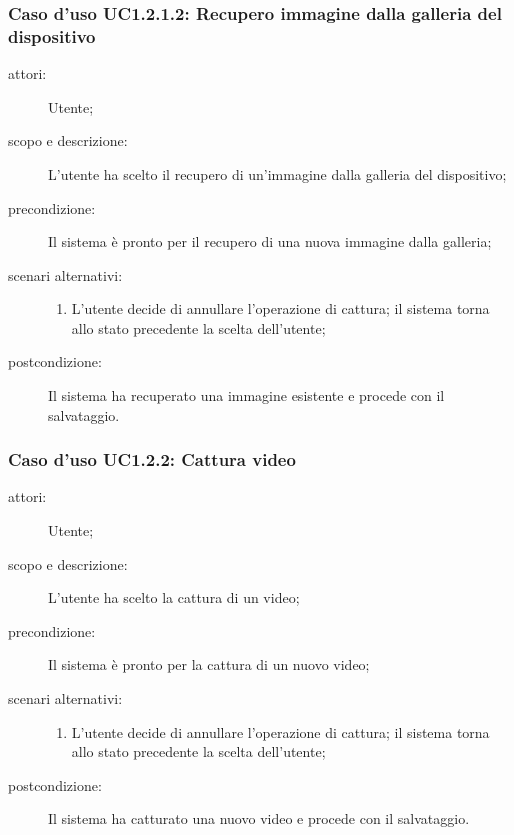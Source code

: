 \subsubsection{Caso d'uso UC1.2.1.2: Recupero immagine dalla galleria del dispositivo}
\begin{description}
\item[attori:] Utente;
\item[scopo e descrizione:] L'utente ha scelto il recupero di un'immagine dalla galleria del dispositivo;
\item[precondizione:] Il sistema è pronto per il recupero di una nuova immagine dalla galleria;
\item[scenari alternativi:] \hfill 
	\begin{enumerate}
	\item L'utente decide di annullare l'operazione di cattura; il sistema torna allo stato precedente la scelta dell'utente;
	\end{enumerate}
\item[postcondizione:] Il sistema ha recuperato una immagine esistente e procede con il salvataggio.
\end{description}

\subsubsection{Caso d'uso UC1.2.2: Cattura video}
\begin{description}
\item[attori:] Utente;
\item[scopo e descrizione:] L'utente ha scelto la cattura di un video;
\item[precondizione:] Il sistema è pronto per la cattura di un nuovo video;
\item[scenari alternativi:] \hfill 
	\begin{enumerate}
	\item L'utente decide di annullare l'operazione di cattura; il sistema torna allo stato precedente la scelta dell'utente;
	\end{enumerate}
\item[postcondizione:] Il sistema ha catturato una nuovo video e procede con il salvataggio.
\end{description}

